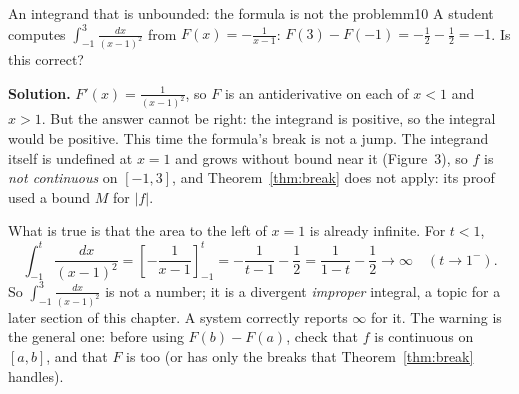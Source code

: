 \documentclass[11pt]{article}
\begin{document}
\begin{exmp}{An integrand that is unbounded: the formula is not the problem}{m10}
A student computes $\displaystyle\int_{-1}^{3}\frac{dx}{(x-1)^2}$ from $F(x)=-\frac1{x-1}$: $F(3)-F(-1)=-\frac12-\frac12=-1$. Is this correct?

\textbf{Solution.} $F'(x)=\frac1{(x-1)^2}$, so $F$ is an antiderivative on each of $x<1$ and $x>1$. But the answer cannot be right: the integrand is positive, so the integral would be positive. This time the formula's break is not a jump. The integrand itself is undefined at $x=1$ and grows without bound near it (Figure~3), so $f$ is \emph{not continuous} on $[-1,3]$, and Theorem~\ref{thm:break} does not apply: its proof used a bound $M$ for $\lvert f\rvert$.

What is true is that the area to the left of $x=1$ is already infinite. For $t<1$,
\[\int_{-1}^{t}\frac{dx}{(x-1)^2}=\left[-\frac1{x-1}\right]_{-1}^{t}=-\frac1{t-1}-\frac12=\frac1{1-t}-\frac12\longrightarrow\infty\quad(t\to1^-).\]
So $\int_{-1}^3\frac{dx}{(x-1)^2}$ is not a number; it is a divergent \emph{improper} integral, a topic for a later section of this chapter. A system correctly reports $\infty$ for it. The warning is the general one: before using $F(b)-F(a)$, check that $f$ is continuous on $[a,b]$, and that $F$ is too (or has only the breaks that Theorem~\ref{thm:break} handles).


\end{exmp}
\end{document}

